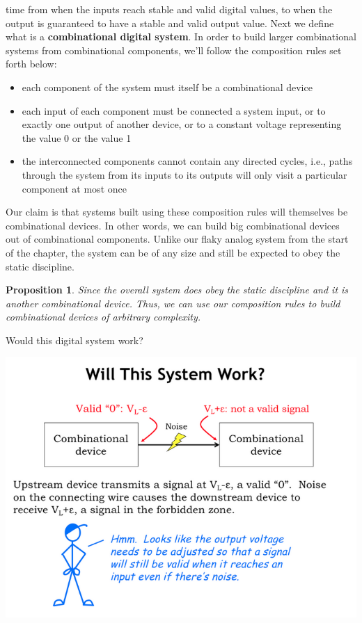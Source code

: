 \documentclass[a4paper,twoside]{article}
\newtheorem{proposition}[theorem]{Proposition}
\numberwithin{equation}{section}
\begin{document}
time from when the inputs reach stable and valid digital values, to when the output is guaranteed to
have a stable and valid output value.\newline
Next we define what is a \textbf{combinational digital system}. In order to build larger combinational
systems from combinational components, we'll follow the composition rules set forth below:
\begin{itemize}
    \item each component of the system must itself be a combinational device
    \item each input of each component must be connected a system input, or to exactly one output of
          another device, or to a constant voltage representing the value 0 or the value 1
    \item the interconnected components cannot contain any directed cycles, i.e., paths through the
          system from its inputs to its outputs will only visit a particular component at most once
\end{itemize}
Our claim is that systems built using these composition rules will themselves be combinational devices.
In other words, we can build big combinational devices out of combinational components. Unlike our flaky analog system from the start of the chapter, the system can be of any size and still be expected to obey the static discipline.
\begin{proposition}
    Since the overall system does obey the static discipline and it is another combinational device.
    Thus, we can use our composition rules to build combinational devices of arbitrary complexity.
\end{proposition}
Would this digital system work?
\begin{center}
    \includegraphics[scale = 0.3]{assets/will_it_work.png}
\end{center}
\end{document}

